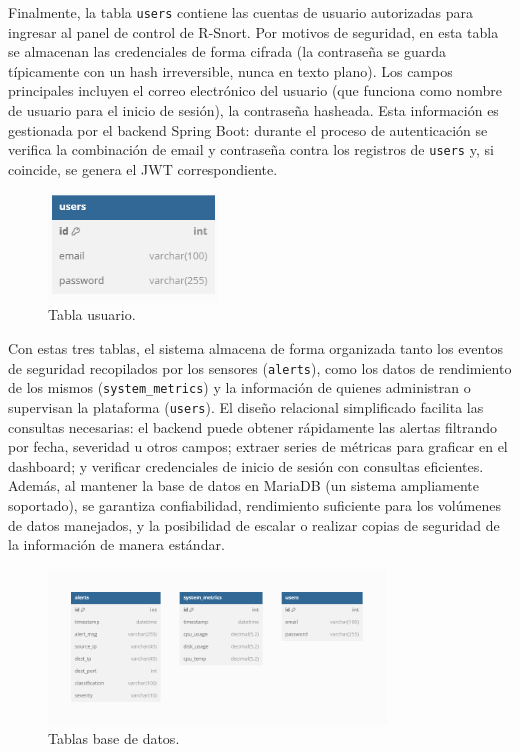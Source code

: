 \documentclass[11pt,a4paper,twoside]{report}
\begin{document}
Finalmente, la tabla \texttt{users} contiene las cuentas de usuario autorizadas para ingresar al panel de control de R-Snort. Por motivos de seguridad, en esta tabla se almacenan las credenciales de forma cifrada (la contraseña se guarda típicamente con un hash irreversible, nunca en texto plano). Los campos principales incluyen el correo electrónico del usuario (que funciona como nombre de usuario para el inicio de sesión), la contraseña hasheada. Esta información es gestionada por el backend Spring Boot: durante el proceso de autenticación se verifica la combinación de email y contraseña contra los registros de \texttt{users} y, si coincide, se genera el JWT correspondiente.\newline

\begin{figure}[H]
	\centering
	\includegraphics[width=0.4\textwidth]{documento/9.png}
	\caption{Tabla usuario.}
	\label{fig:usuario-bd}
\end{figure}

Con estas tres tablas, el sistema almacena de forma organizada tanto los eventos de seguridad recopilados por los sensores (\texttt{alerts}), como los datos de rendimiento de los mismos (\texttt{system\_metrics}) y la información de quienes administran o supervisan la plataforma (\texttt{users}). El diseño relacional simplificado facilita las consultas necesarias: el backend puede obtener rápidamente las alertas filtrando por fecha, severidad u otros campos; extraer series de métricas para graficar en el dashboard; y verificar credenciales de inicio de sesión con consultas eficientes. Además, al mantener la base de datos en MariaDB (un sistema ampliamente soportado), se garantiza confiabilidad, rendimiento suficiente para los volúmenes de datos manejados, y la posibilidad de escalar o realizar copias de seguridad de la información de manera estándar.

\begin{figure}[H]
	\centering
	\includegraphics[width=0.8\textwidth]{documento/10.png}
	\caption{Tablas base de datos.}
	\label{fig:esquema-bd}
\end{figure}
\end{document}
